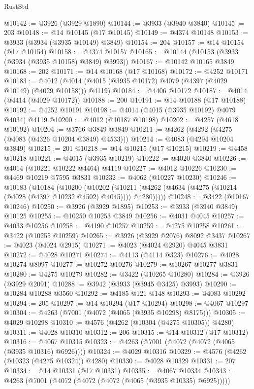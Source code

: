 \begin{lexlean}{RustStd}
\begin{coremodule}
@10142 := @3926 (@3929 @1890)
@10144 := @3933 (@3940 @3840)
@10145 := 203
@10148 := @14 @10145 (@17 @10145)
@10149 := @4374 @10148
@10153 := @3933 (@3934 (@3935 @10149) @3849)
@10154 := 204
@10157 := @14 @10154 (@17 @10154)
@10158 := @4374 @10157
@10165 := @10144 (@10153 (@3933 (@3934 (@3935 @10158) @3849) @3993))
@10167 := @10142 @10165 @3849
@10168 := 202
@10171 := @14 @10168 (@17 @10168)
@10172 := @4252 @10171
@10183 := @4012 (@4014 (@4015 (@3935 @10172) @4079 (@4397 (@4029 @10149) (@4029 @10158))) @4119)
@10184 := @4406 @10172
@10187 := @4014 (@4414 (@4029 @10172))
@10188 := 200
@10191 := @14 @10188 (@17 @10188)
@10192 := @4252 @10191
@10198 := @4014 (@4015 (@3935 @10192) @4079 @4034) @4119
@10200 := @4012 (@10187 @10198)
@10202 := @4257 (@4618 @10192)
@10204 := @3766 @3849 @3849
@10211 := @4262 (@4292 (@4275 (@4083 (@4326 @10204 @3849) @4533)))
@10214 := @4083 (@4294 @10204 @3849)
@10215 := 201
@10218 := @14 @10215 (@17 @10215)
@10219 := @4458 @10218
@10221 := @4015 (@3935 @10219)
@10222 := @4020 @3840
@10226 := @4014 (@10221 @10222 @4464) @4119
@10227 := @4012 @10226
@10230 := @4469 @10219 @7595 @3831
@10232 := @4062 (@10227 @10230)
@10246 := @10183
    (@10184
      (@10200
        (@10202
          (@10211 (@4262 (@4634 (@4275 (@10214 (@4028 (@4397 @10232 @4502) @4045)))) @4280)))))
@10248 := @3422 (@10167 @10246)
@10250 := @3926 (@3929 @1895)
@10253 := @3933 (@3940 @3849) @10125
@10255 := @10250 @10253 @3849
@10256 := @4031 @4045
@10257 := @4033 @10256
@10258 := @4190 @10257
@10259 := @4275 @10258
@10261 := @3422 (@10255 @10259)
@10265 := @3926 (@3929 @2076) @8092 @3437
@10267 := @4023 (@4024 @2915)
@10271 := @4023 (@4024 @2920) @4045 @3831
@10272 := @4028 @10271
@10274 := @4113 (@4114 @323)
@10276 := @4028 @10274 @8097
@10277 := @10272 @10276
@10279 := @10267 @10277 @3831
@10280 := @4275 @10279
@10282 := @3422 (@10265 @10280)
@10284 := @3926 (@3929 @2091)
@10288 := @3942 (@3933 (@3945 @3425) @3993)
@10290 := @10284 @10288 @3560
@10292 := @4185 @121 @148
@10293 := @4083 @10292
@10294 := 205
@10297 := @14 @10294 (@17 @10294)
@10298 := @4067 @10297
@10304 := @4263 (@7001 (@4072 (@4065 (@3935 @10298) @8175)))
@10305 := @4029 @10298
@10310 := @4576 (@4262 (@10304 (@4275 @10305)) @4280)
@10311 := @4028 @10310
@10312 := 206
@10315 := @14 @10312 (@17 @10312)
@10316 := @4067 @10315
@10323 := @4263 (@7001 (@4072 (@4072 (@4065 (@3935 @10316) @6926))))
@10324 := @4029 @10316
@10329 := @4576 (@4262 (@10323 (@4275 @10324)) @4280)
@10330 := @4028 @10329
@10331 := 207
@10334 := @14 @10331 (@17 @10331)
@10335 := @4067 @10334
@10343 := @4263 (@7001 (@4072 (@4072 (@4072 (@4065 (@3935 @10335) @6925)))))

\end{coremodule}
\end{lexlean}
